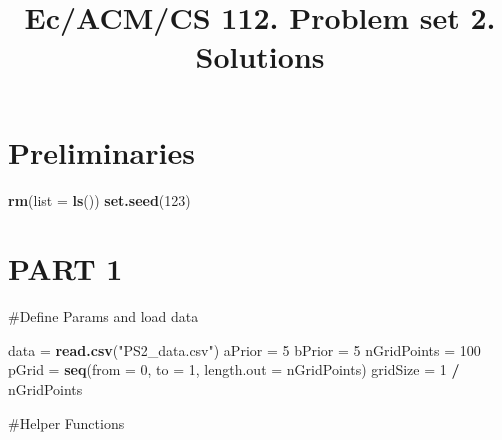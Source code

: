 \documentclass[
]{article}
\title{Ec/ACM/CS 112. Problem set 2. Solutions}
\author{}
\date{\vspace{-2.5em}}
\newenvironment{Shaded}{\begin{snugshade}}{\end{snugshade}}
\newcommand{\AttributeTok}[1]{\textcolor[rgb]{0.13,0.29,0.53}{#1}}
\newcommand{\DecValTok}[1]{\textcolor[rgb]{0.00,0.00,0.81}{#1}}
\newcommand{\FunctionTok}[1]{\textcolor[rgb]{0.13,0.29,0.53}{\textbf{#1}}}
\newcommand{\NormalTok}[1]{#1}
\newcommand{\OtherTok}[1]{\textcolor[rgb]{0.56,0.35,0.01}{#1}}
\newcommand{\SpecialCharTok}[1]{\textcolor[rgb]{0.81,0.36,0.00}{\textbf{#1}}}
\newcommand{\StringTok}[1]{\textcolor[rgb]{0.31,0.60,0.02}{#1}}
\begin{document}
\maketitle

\hypertarget{preliminaries}{%
\section{Preliminaries}\label{preliminaries}}

\begin{Shaded}
\begin{Highlighting}[]
\FunctionTok{rm}\NormalTok{(}\AttributeTok{list =} \FunctionTok{ls}\NormalTok{())}
\FunctionTok{set.seed}\NormalTok{(}\DecValTok{123}\NormalTok{)}
\end{Highlighting}
\end{Shaded}

\hypertarget{part-1}{%
\section{PART 1}\label{part-1}}

\#Define Params and load data

\begin{Shaded}
\begin{Highlighting}[]
\NormalTok{data }\OtherTok{=} \FunctionTok{read.csv}\NormalTok{(}\StringTok{"PS2\_data.csv"}\NormalTok{)}
\NormalTok{aPrior }\OtherTok{=} \DecValTok{5}
\NormalTok{bPrior }\OtherTok{=} \DecValTok{5}
\NormalTok{nGridPoints }\OtherTok{=} \DecValTok{100}
\NormalTok{pGrid }\OtherTok{=} \FunctionTok{seq}\NormalTok{(}\AttributeTok{from =} \DecValTok{0}\NormalTok{, }\AttributeTok{to =} \DecValTok{1}\NormalTok{, }\AttributeTok{length.out =}\NormalTok{ nGridPoints)}
\NormalTok{gridSize }\OtherTok{=} \DecValTok{1} \SpecialCharTok{/}\NormalTok{ nGridPoints}
\end{Highlighting}
\end{Shaded}

\#Helper Functions
\end{document}
